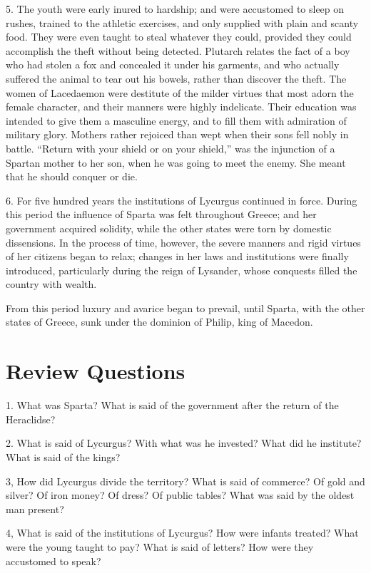 \documentclass[openany,a4paper]{memoir}
\begin{document}
5. The youth were early inured to hardship; and were 
accustomed to sleep on rushes, trained to the athletic exercises, and only supplied with plain and scanty food. They 
were even taught to steal whatever they could, provided 
they could accomplish the theft without being detected. 
Plutarch relates the fact of a boy who had stolen a fox and 
concealed it under his garments, and who actually suffered 
the animal to tear out his bowels, rather than discover the 
theft. The women of Lacedaemon were destitute of the 
milder virtues that most adorn the female character, and 
their manners were highly indelicate. Their education was 
intended to give them a masculine energy, and to fill them 
with admiration of military glory. Mothers rather rejoiced 
than wept when their sons fell nobly in battle. ``Return 
with your shield or on your shield,'' was the injunction of a 
Spartan mother to her son, when he was going to meet the 
enemy. She meant that he should conquer or die. 


6. For five hundred years the institutions of Lycurgus 
continued in force. During this period the influence of 
Sparta was felt throughout Greece; and her government 
acquired solidity, while the other states were torn by domestic dissensions. In the process of time, however, the 
severe manners and rigid virtues of her citizens began to 
relax; changes in her laws and institutions were finally introduced, particularly during the reign of Lysander, whose 
conquests filled the country with wealth. 

From this period luxury and avarice began to prevail, 
until Sparta, with the other states of Greece, sunk under the 
dominion of Philip, king of Macedon. 


\section{Review Questions}


1. What was Sparta? What is said of the government after the return of the Heraclidse?  

2. What is said of Lycurgus? 
With what was he invested? What did he institute? What is said of the 
kings?  

3, How did Lycurgus divide the territory? What is said of commerce? Of gold and silver? Of iron money? Of dress? Of public tables? 
What was said by the oldest man present?  

4, What is said of the 
institutions of Lycurgus? How were infants treated? What were the 
young taught to pay? What is said of letters? How were they accustomed to speak?
\end{document}
